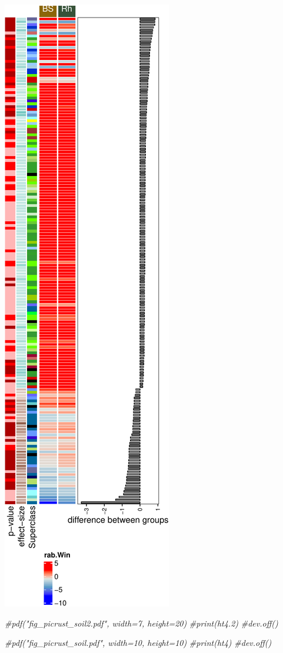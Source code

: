 \documentclass[]{interact}
\theoremstyle{plain}%
\theoremstyle{definition}
\theoremstyle{remark}
\newenvironment{Shaded}{\begin{snugshade}}{\end{snugshade}}
\newcommand{\CommentTok}[1]{\textcolor[rgb]{0.56,0.35,0.01}{\textit{#1}}}
\begin{document}
\begin{center}\includegraphics{Doc_pdf_files/figure-latex/unnamed-chunk-42-1} \end{center}

\begin{Shaded}
\begin{Highlighting}[]
\CommentTok{\#pdf("fig\_picrust\_soil2.pdf", width=7, height=20)}
\CommentTok{\#print(ht4.2)}
\CommentTok{\#dev.off()}

\CommentTok{\#pdf("fig\_picrust\_soil.pdf", width=10, height=10)}
\CommentTok{\#print(ht4)}
\CommentTok{\#dev.off()}
\end{Highlighting}
\end{Shaded}
\end{document}
